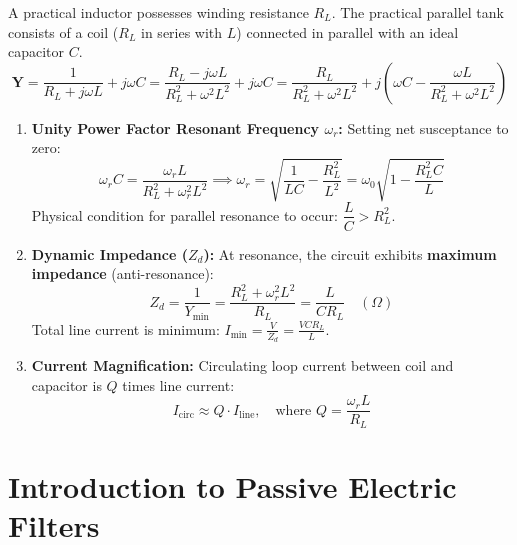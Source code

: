 \documentclass[12pt,a4paper]{article}
\begin{document}
A practical inductor possesses winding resistance $R_L$. The practical parallel tank consists of a coil ($R_L$ in series with $L$) connected in parallel with an ideal capacitor $C$.
\begin{equation}
  \mathbf{Y} = \frac{1}{R_L + j\omega L} + j\omega C = \frac{R_L - j\omega L}{R_L^2 + \omega^2 L^2} + j\omega C = \frac{R_L}{R_L^2 + \omega^2 L^2} + j\left(\omega C - \frac{\omega L}{R_L^2 + \omega^2 L^2}\right)
\end{equation}

\begin{tcolorbox}[defbox, title={\textbf{Practical Tank Circuit Resonance Conditions}}]
\begin{enumerate}[leftmargin=*]
  \item \textbf{Unity Power Factor Resonant Frequency $\omega_r$:} Setting net susceptance to zero:
  \begin{equation}
    \omega_r C = \frac{\omega_r L}{R_L^2 + \omega_r^2 L^2} \implies \omega_r = \sqrt{\frac{1}{LC} - \frac{R_L^2}{L^2}} = \omega_0\sqrt{1 - \frac{R_L^2 C}{L}}
  \end{equation}
  Physical condition for parallel resonance to occur: $\dfrac{L}{C} > R_L^2$.
  \item \textbf{Dynamic Impedance ($Z_d$):} At resonance, the circuit exhibits \textbf{maximum impedance} (anti-resonance):
  \begin{equation}
    Z_d = \frac{1}{Y_{\min}} = \frac{R_L^2 + \omega_r^2 L^2}{R_L} = \frac{L}{C R_L} \quad (\Omega)
  \end{equation}
  Total line current is minimum: $I_{\min} = \frac{V}{Z_d} = \frac{V C R_L}{L}$.
  \item \textbf{Current Magnification:} Circulating loop current between coil and capacitor is $Q$ times line current:
  \begin{equation}
    I_{\text{circ}} \approx Q \cdot I_{\text{line}}, \quad \text{where } Q = \frac{\omega_r L}{R_L}
  \end{equation}
\end{enumerate}
\end{tcolorbox}

\section{Introduction to Passive Electric Filters}
\end{document}
